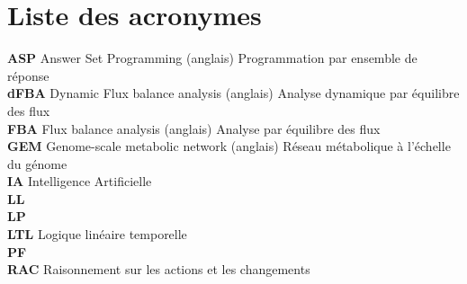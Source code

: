 \documentclass[../main.tex]{subfiles}
\begin{document}
\noindent
\chapter*{Liste des acronymes}
\noindent
\textbf{ASP}  \hspace{.5em} Answer Set Programming (anglais) Programmation par ensemble de réponse \\
\textbf{dFBA}  \hspace{.5em} Dynamic Flux balance analysis (anglais) Analyse dynamique par équilibre des flux \\
\textbf{FBA} \hspace{.5em} Flux balance analysis (anglais) Analyse par équilibre des flux \\
\textbf{GEM} \hspace{.5em} Genome-scale metabolic network (anglais) Réseau métabolique à l'échelle du génome \\
\textbf{IA} \hspace{.5em} Intelligence Artificielle \\
\textbf{LL} \hspace{.5em} \lactis \\
\textbf{LP} \hspace{.5em} \plantarum \\
\textbf{LTL} \hspace{.5em} Logique linéaire temporelle \\
\textbf{PF} \hspace{.5em} \freud \\
\textbf{RAC} \hspace{.5em} Raisonnement sur les actions et les changements \\
\end{document}
